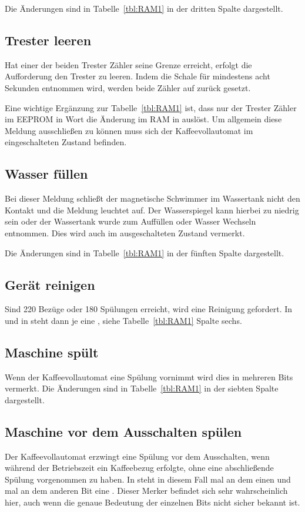 Die Änderungen sind in Tabelle~\ref{tbl:RAM1} in der dritten Spalte dargestellt.

\subsection{Trester leeren}
Hat einer der beiden Trester Zähler seine Grenze erreicht, erfolgt die Aufforderung den Trester zu leeren.
Indem die Schale für mindestens acht Sekunden entnommen wird, werden beide Zähler auf  zurück gesetzt.

Eine wichtige Ergänzung zur Tabelle~\ref{tbl:RAM1} ist, dass nur der Trester Zähler im \ac{EEPROM} in Wort  die Änderung im \ac{RAM} in  auslöst.
Um allgemein diese Meldung ausschließen zu können muss sich der Kaffeevollautomat im eingeschalteten Zustand befinden.

\subsection{Wasser füllen} %
Bei dieser Meldung schließt der magnetische Schwimmer im Wassertank nicht den Kontakt und die Meldung leuchtet auf.
Der Wasserspiegel kann hierbei zu niedrig sein oder der Wassertank wurde zum Auffüllen oder Wasser Wechseln entnommen.
Dies wird auch im ausgeschalteten Zustand vermerkt.

Die Änderungen sind in Tabelle~\ref{tbl:RAM1} in der fünften Spalte dargestellt.

\subsection{Gerät reinigen}
Sind 220 Bezüge oder 180 Spülungen erreicht, wird eine Reinigung gefordert.
In  und in  steht dann je eine , siehe Tabelle~\ref{tbl:RAM1} Spalte sechs.

\subsection{Maschine spült}
Wenn der Kaffeevollautomat eine Spülung vornimmt wird dies in mehreren Bits vermerkt.
Die Änderungen sind in Tabelle~\ref{tbl:RAM1} in der siebten Spalte dargestellt.

\subsection{Maschine vor dem Ausschalten spülen}
Der Kaffeevollautomat erzwingt eine Spülung vor dem Ausschalten, wenn während der Betriebszeit ein Kaffeebezug erfolgte, ohne eine abschließende Spülung vorgenommen zu haben.
In  steht in diesem Fall mal an dem einen und mal an dem anderen Bit eine .
Dieser Merker befindet sich sehr wahrscheinlich hier, auch wenn die genaue Bedeutung der einzelnen Bits nicht sicher bekannt ist.

